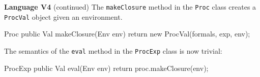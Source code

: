 \begin{minipage}[t]{\sw}
\slidenumber
\LARGE
{\bf Language V4} (continued)\exx
\Large
\emm{}\exx
\LARGE
The \verb'makeClosure' method in the \verb'Proc' class
creates a \verb'ProcVal' object given an environment.
\Large
\begin{qv}
Proc
    public Val makeClosure(Env env) {
        return new ProcVal(formals, exp, env);
    }
\end{qv}
\LARGE
The semantics of the \verb'eval' method
in the \verb'ProcExp' class is now trivial:
\Large
\begin{qv}
ProcExp
    public Val eval(Env env) {
        return proc.makeClosure(env);
    }
\end{qv}
\end{minipage}

\clearpage

